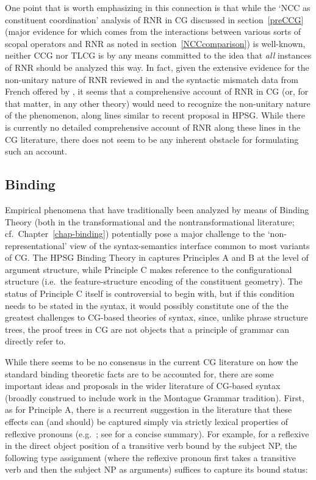 \documentclass[output=paper]{langsci/langscibook}
\begin{document}
One point that is worth emphasizing in this connection is that
while the `NCC as constituent coordination' analysis of RNR in CG
discussed in section~\ref{preCCG} (major evidence for which comes from the
interactions between various sorts of scopal operators and RNR as
noted in section~\ref{NCCcomparison}) is well-known, neither CCG nor TLCG is by
any means committed to the idea that \emph{all} instances of RNR should be
analyzed this way.
In fact, given the extensive evidence for the non-unitary nature of
RNR reviewed in \citet{Chaves2014a-u} and the syntactic mismatch data from
French offered by \citet{ACS2016a-u},  it seems
that a comprehensive account of RNR in CG (or, for that matter, in any
other theory) would need to recognize the
non-unitary nature of the phenomenon, along lines similar to
 recent proposal in HPSG. While there is currently no
detailed comprehensive account of RNR along these lines in the
CG literature, there does not  seem to be any inherent 
obstacle for formulating such an account.


\subsection{Binding}

Empirical phenomena that have traditionally been analyzed by means of
Binding Theory (both in the transformational and the
nontransformational literature; cf.~Chapter~\ref{chap-binding})
 potentially pose a major challenge to the
`non-representational' view of the syntax-semantics interface common
to most variants of CG. The HPSG Binding Theory in \citet{ps2}
captures Principles A and B at the level of argument structure, while
Principle C makes reference to the configurational structure (i.e.\
the feature-structure encoding of the constituent geometry). The
status of Principle C itself is controversial to begin with, but if
this condition needs to be stated in the syntax, it would possibly
constitute one of the the greatest challenges to CG-based theories of
syntax, since, unlike phrase structure trees, the proof trees in CG
are not objects that a principle of grammar can directly refer to.

While there seems to be no consensus in the current CG literature on
how the standard binding theoretic facts are to be accounted for, there are
some important ideas and proposals in the wider literature of CG-based
syntax (broadly construed to include work in the Montague Grammar
tradition). First, as for Principle A, there is a recurrent suggestion
in the literature that these effects can (and should) be captured
simply via strictly lexical properties of reflexive pronouns
(e.g.\  \citet{szabolcsi1992}; see \citet{buringbinding} for a concise summary).
For example, for a reflexive in the direct object position
of a transitive verb bound by the subject NP,
the following type assignment (where the reflexive pronoun first takes
a transitive verb and then the subject NP as arguments) suffices to
capture its bound status:
\end{document}
